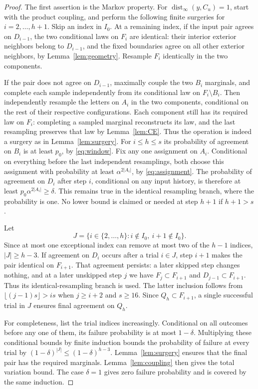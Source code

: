 \documentclass[11pt]{amsart}
\theoremstyle{definition}
\newcommand{\dist}{\operatorname{dist}_\infty}
\newcommand{\1}{\mathbf 1}
\begin{document}
\begin{proof}
The first assertion is the Markov property. For $\dist(y,C_u)=1$, start
with the product coupling, and perform the following finite surgeries for
$i=2,\ldots,h+1$. Skip an index in $I_0$.
At a remaining index, if the input pair agrees on $D_{i-1}$, the two
conditional laws on $F_i$ are identical: their interior exterior neighbors
belong to $D_{i-1}$, and the fixed boundaries agree on all other exterior
neighbors, by Lemma~\ref{lem:geometry}. Resample $F_i$ identically in the
two components.

If the pair does not agree on $D_{i-1}$, maximally couple the two
$B_i$ marginals, and complete each sample independently from its
conditional law on $F_i\setminus B_i$. Then independently resample the
letters on $A_i$ in the two components, conditional on the rest of their
respective configurations. Each component still has its required law on
$F_i$: completing a sampled marginal reconstructs its law, and the last
resampling preserves that law by Lemma~\ref{lem:CE}. Thus the operation is
indeed a surgery as in Lemma~\ref{lem:surgery}.
For $i\le h\le s$ its probability of agreement on $B_i$ is at least
$p_0$, by \eqref{eq:window}. Fix any one assignment on $A_i$.
Conditional on everything before the last independent resamplings, both
choose this assignment with probability at least $\alpha^{2|A_i|}$,
by \eqref{eq:assignment}. The probability of agreement on $D_i$ after
step $i$, conditional on any input history, is therefore at least
$p_0\alpha^{2|A_i|}\ge\delta$. This remains true in the identical
resampling branch, where the probability is one. No lower bound is claimed
or needed at step $h+1$ if $h+1>s$.

Let
\[
 J=\{i\in\{2,\ldots,h\}:i\notin I_0,\ i+1\notin I_0\}.
\]
Since at most one exceptional index can remove at most two of the $h-1$
indices, $|J|\ge h-3$. If agreement on $D_i$ occurs after a trial
$i\in J$, step $i+1$ makes the pair identical on $F_{i+1}$.
That agreement persists: a later skipped step changes nothing, and at a
later unskipped step $j$ we have $F_j\subset F_{i+1}$ and
$D_{j-1}\subset F_{i+1}$. Thus its identical-resampling branch is used.
The latter inclusion follows from
$\lfloor(j-1)s\rfloor>is$ when $j\ge i+2$ and $s\ge16$.
Since $Q_h\subset F_{i+1}$, a single successful trial in $J$ ensures final
agreement on $Q_h$.

For completeness, list the trial indices increasingly. Conditional on all
outcomes before any one of them, its failure probability is at most
$1-\delta$. Multiplying these conditional bounds by finite induction
bounds the probability of failure at every trial by
$(1-\delta)^{|J|}\le(1-\delta)^{h-3}$. Lemma~\ref{lem:surgery} ensures
that the final pair has the required marginals. Lemma~\ref{lem:coupling}
then gives the total variation bound. The case $\delta=1$ gives zero
failure probability and is covered by the same induction.
\end{proof}
\end{document}
